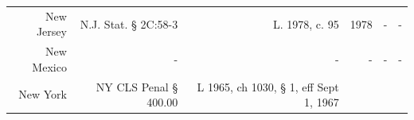 \documentclass[]{article}
\begin{document}
\begin{longtable}[c]{@{}rrrrrr@{}}
\begin{minipage}[t]{0.10\columnwidth}\raggedleft\strut
New Jersey
\strut\end{minipage} &
\begin{minipage}[t]{0.21\columnwidth}\raggedleft\strut
N.J. Stat. § 2C:58-3
\strut\end{minipage} &
\begin{minipage}[t]{0.22\columnwidth}\raggedleft\strut
L. 1978, c. 95
\strut\end{minipage} &
\begin{minipage}[t]{0.10\columnwidth}\raggedleft\strut
1978
\strut\end{minipage} &
\begin{minipage}[t]{0.10\columnwidth}\raggedleft\strut
-
\strut\end{minipage} &
\begin{minipage}[t]{0.10\columnwidth}\raggedleft\strut
-
\strut\end{minipage}\tabularnewline
\begin{minipage}[t]{0.10\columnwidth}\raggedleft\strut
New Mexico
\strut\end{minipage} &
\begin{minipage}[t]{0.21\columnwidth}\raggedleft\strut
-
\strut\end{minipage} &
\begin{minipage}[t]{0.22\columnwidth}\raggedleft\strut
-
\strut\end{minipage} &
\begin{minipage}[t]{0.10\columnwidth}\raggedleft\strut
-
\strut\end{minipage} &
\begin{minipage}[t]{0.10\columnwidth}\raggedleft\strut
-
\strut\end{minipage} &
\begin{minipage}[t]{0.10\columnwidth}\raggedleft\strut
-
\strut\end{minipage}\tabularnewline
\begin{minipage}[t]{0.10\columnwidth}\raggedleft\strut
New York
\strut\end{minipage} &
\begin{minipage}[t]{0.21\columnwidth}\raggedleft\strut
NY CLS Penal § 400.00
\strut\end{minipage} &
\begin{minipage}[t]{0.22\columnwidth}\raggedleft\strut
L 1965, ch 1030, § 1, eff Sept 1, 1967
\strut\end{minipage} &
\begin{minipage}[t]{0.10\columnwidth}\raggedleft\strut

\end{minipage}
\end{longtable}
\end{document}
